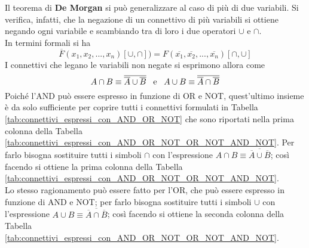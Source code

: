 \documentclass[a4paper]{extarticle}
\begin{document}
\vspace{1em}
\noindent
Il teorema di \textbf{De Morgan} si può generalizzare al caso di più di due variabili. Si verifica, infatti, che la negazione di un connettivo di più variabili si ottiene negando ogni variabile e scambiando tra di loro i due operatori \(\cup\) e \(\cap\).\\
In termini formali si ha
\[\overline{F}(x_1, x_2, ..., x_n)[\cup, \cap]) = F(\overline{x_1}, \overline{x_2}, ..., \overline{x_n})[\cap, \cup]\]
I connettivi che legano le variabili non negate si esprimono allora come
\[A \cap B \equiv \overline{\overline{A} \cup \overline{B}} \hspace{0.5em} \text{ e } \hspace{0.5em} A \cup B \equiv \overline{\overline{A} \cap \overline{B}}\]
Poiché l’AND può essere espresso in funzione di OR e NOT, quest’ultimo insieme è da solo sufficiente per coprire tutti i connettivi formulati in Tabella \ref{tab:connettivi_espressi_con_AND_OR_NOT} che sono riportati nella prima colonna della Tabella \ref{tab:connettivi_espressi_con_AND_OR_NOT_OR_NOT_AND_NOT}. Per farlo bisogna sostituire tutti i simboli \(\cap\) con l'espressione \(A \cap B \equiv \overline{\overline{A} \cup \overline{B}}\); così facendo si ottiene la prima colonna della Tabella \ref{tab:connettivi_espressi_con_AND_OR_NOT_OR_NOT_AND_NOT}.\\
Lo stesso ragionamento può essere fatto per l’OR, che può essere espresso in funzione di AND e NOT; per farlo bisogna sostituire tutti i simboli \(\cup\) con l'espressione \(A \cup B \equiv \overline{\overline{A} \cap \overline{B}}\); così facendo si ottiene la seconda colonna della Tabella \ref{tab:connettivi_espressi_con_AND_OR_NOT_OR_NOT_AND_NOT}.
\end{document}
